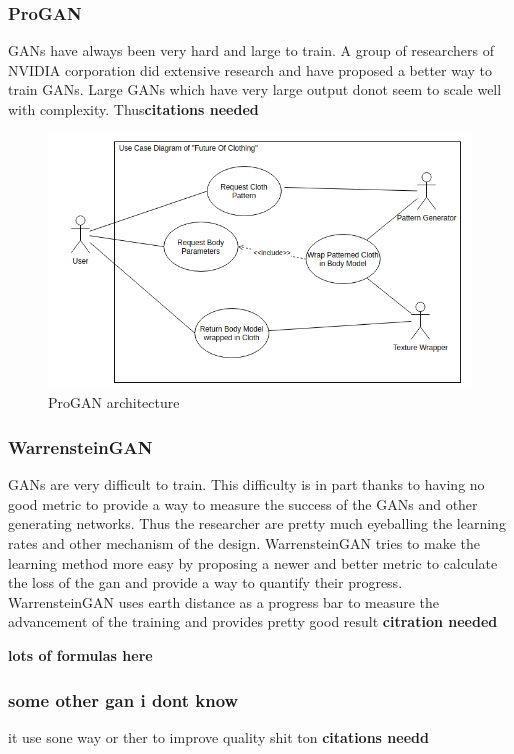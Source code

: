 \documentclass{article}
\begin{document}
\subsubsection{ProGAN}
GANs have always been very hard and large to train. A group of researchers of NVIDIA corporation did extensive research and have proposed a better way to train GANs. Large GANs which have very large output donot seem to scale well with complexity. Thus\textbf{citations needed}
\begin{figure}[h]
    \includegraphics[scale=0.5]{images/softwareDiagrams/FinalSystemUseCase.png}
    \centering
    \caption{ProGAN architecture}    
\end{figure}

\subsubsection{WarrensteinGAN}
GANs are very difficult to train. This difficulty is in part thanks to having no good metric to provide a way to measure the success of the GANs and other generating networks. Thus the researcher are pretty much eyeballing the learning rates and other mechanism of the design. WarrensteinGAN tries to make the learning method more easy by proposing a newer and better metric to calculate the loss of the gan and provide a way to quantify their progress. WarrensteinGAN uses earth distance as a progress bar to measure the advancement of the training and provides pretty good result \textbf{citration needed}
\break

\textbf{lots of formulas here}

\subsubsection{some other gan i dont know}
it use sone way or ther to improve quality shit ton \textbf{citations needd}
\end{document}
